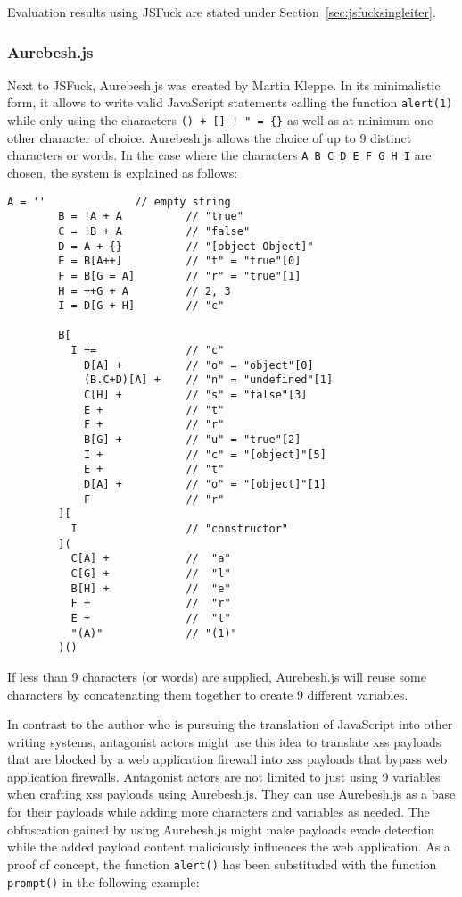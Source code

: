 Evaluation results using JSFuck are stated under Section~\ref{sec:jsfucksingleiter}.

\subsubsection{Aurebesh.js}
\label{sec:aurebesh}
Next to JSFuck, Aurebesh.js was created by Martin Kleppe. In its minimalistic form, it allows to write valid JavaScript statements calling the function \verb|alert(1)| while only using the characters \verb|() + [] ! " = {}| as well as at minimum one other character of choice. Aurebesh.js allows the choice of up to 9 distinct characters or words. In the case where the characters \verb|A B C D E F G H I| are chosen, the system is explained as follows:
\begin{lstlisting}[style=basicStyle, caption=Aurebesh.js explanation \cite{mk/aurebesh}, label={lst:aurebeshexplanation}]
		A = ''              // empty string
		B = !A + A          // "true"
		C = !B + A          // "false"
		D = A + {}          // "[object Object]"
		E = B[A++]          // "t" = "true"[0]
		F = B[G = A]        // "r" = "true"[1]
		H = ++G + A         // 2, 3
		I = D[G + H]        // "c"

		B[
		  I +=              // "c"
		    D[A] +          // "o" = "object"[0]
		    (B.C+D)[A] +    // "n" = "undefined"[1]
		    C[H] +          // "s" = "false"[3]
		    E +             // "t"
		    F +             // "r"
		    B[G] +          // "u" = "true"[2]
		    I +             // "c" = "[object]"[5]
		    E +             // "t"
		    D[A] +          // "o" = "[object]"[1]
		    F               // "r"
		][
		  I                 // "constructor"
		](
		  C[A] +            //  "a"
		  C[G] +            //  "l"
		  B[H] +            //  "e"
		  F +               //  "r"
		  E +               //  "t"
		  "(A)"             // "(1)"
		)()
\end{lstlisting}
If less than 9 characters (or words) are supplied, Aurebesh.js will reuse some characters by concatenating them together to create 9 different variables. \cite{mk/aurebesh}

In contrast to the author who is pursuing the translation of JavaScript into other writing systems, antagonist actors might use this idea to translate \acrshort{xss} payloads that are blocked by a web application firewall into \acrshort{xss} payloads that bypass web application firewalls. Antagonist actors are not limited to just using 9 variables when crafting \acrshort{xss} payloads using Aurebesh.js. They can use Aurebesh.js as a base for their payloads while adding more characters and variables as needed.
The obfuscation gained by using Aurebesh.js might make payloads evade detection while the added payload content maliciously influences the web application.
As a proof of concept, the function \verb|alert()| has been substituded with the function \verb|prompt()| in the following example:

